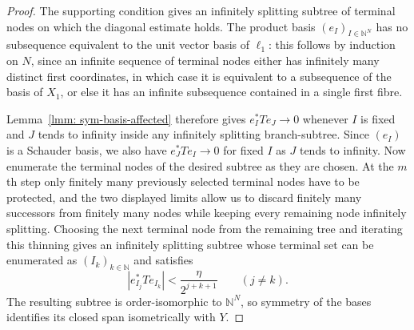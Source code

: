 \documentclass[11pt]{amsart}
\theoremstyle{plain}
\theoremstyle{definition}
\numberwithin{equation}{section}
\newcommand{\N}{\mathbb{N}}
\begin{document}
\begin{proof}
    The supporting condition gives an infinitely splitting subtree of terminal nodes on which the diagonal estimate holds. The product basis $(e_I)_{I\in\N^N}$ has no subsequence equivalent to the unit vector basis of $\ell_1$: this follows by induction on $N$, since an infinite sequence of terminal nodes either has infinitely many distinct first coordinates, in which case it is equivalent to a subsequence of the basis of $X_1$, or else it has an infinite subsequence contained in a single first fibre.

    Lemma~\ref{lmm: sym-basis-affected} therefore gives
    \(
        e_I^*Te_J\longrightarrow 0
    \)
    whenever $I$ is fixed and $J$ tends to infinity inside any infinitely splitting branch-subtree. Since $(e_I)$ is a Schauder basis, we also have
    \(
        e_J^*Te_I\longrightarrow 0
    \)
    for fixed $I$ as $J$ tends to infinity. Now enumerate the terminal nodes of the desired subtree as they are chosen. At the $m$th step only finitely many previously selected terminal nodes have to be protected, and the two displayed limits allow us to discard finitely many successors from finitely many nodes while keeping every remaining node infinitely splitting. Choosing the next terminal node from the remaining tree and iterating this thinning gives an infinitely splitting subtree whose terminal set can be enumerated as $(I_k)_{k\in\N}$ and satisfies
    \[
        |e_{I_j}^*Te_{I_k}|<\frac{\eta}{2^{j+k+1}}
        \qquad(j\neq k).
    \]
    The resulting subtree is order-isomorphic to $\N^N$, so symmetry of the bases identifies its closed span isometrically with $Y$.
\end{proof}
\end{document}
